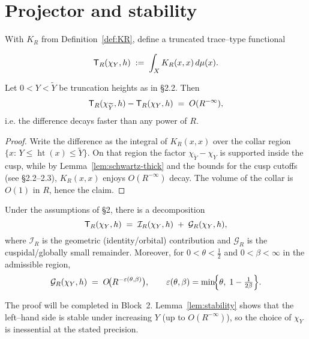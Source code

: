 \section{Projector and stability}\label{sec:projector}

With $K_R$ from Definition~\ref{def:KR}, define a truncated
trace–type functional
\begin{definition}\label{def:TR}
\[
  \mathsf{T}_R(\chi_Y,h) \;:=\; \int_X K_R(x,x)\,d\mu(x).
\]
\end{definition}

\begin{lemma}\label{lem:stability}
Let $0<Y<\widetilde{Y}$ be truncation heights as in §2.2.
Then
\[
  \mathsf{T}_R(\chi_{\widetilde{Y}},h) - \mathsf{T}_R(\chi_Y,h) \;=\; O(R^{-\infty}) ,
\]
i.e. the difference decays faster than any power of $R$.
\end{lemma}

\begin{proof}
Write the difference as the integral of $K_R(x,x)$ over the collar region
$\{x:\, Y\le \operatorname{ht}(x)\le \widetilde{Y}\}$. On that region the factor
$\chi_{\widetilde{Y}}-\chi_Y$ is supported inside the cusp, while by
Lemma~\ref{lem:schwartz-thick} and the bounds for the cusp cutoffs (see §2.2–2.3),
$K_R(x,x)$ enjoys $O(R^{-\infty})$ decay. The volume of the collar is $O(1)$ in $R$,
hence the claim.
\end{proof}

\begin{theorem}\label{thm:main}
Under the assumptions of §2, there is a decomposition
\[
  \mathsf{T}_R(\chi_Y,h) \;=\; \mathcal{I}_R(\chi_Y,h) \;+\; \mathcal{G}_R(\chi_Y,h),
\]
where $\mathcal{I}_R$ is the geometric (identity/orbital) contribution and
$\mathcal{G}_R$ is the cuspidal/globally small remainder.
Moreover, for $0<\theta<\tfrac12$ and $0<\beta<\infty$ in the admissible region,
\[
  \mathcal{G}_R(\chi_Y,h) \;=\; O\!\bigl(R^{-\varepsilon(\theta,\beta)}\bigr),
  \qquad \varepsilon(\theta,\beta)=\min\!\Bigl\{\theta,\; 1-\tfrac{1}{2\beta}\Bigr\}.
\]
\end{theorem}

\begin{remark}
The proof will be completed in Block~2.
Lemma~\ref{lem:stability} shows that the left–hand side is stable under increasing $Y$
(up to $O(R^{-\infty})$), so the choice of $\chi_Y$ is inessential at the stated precision.
\end{remark}
